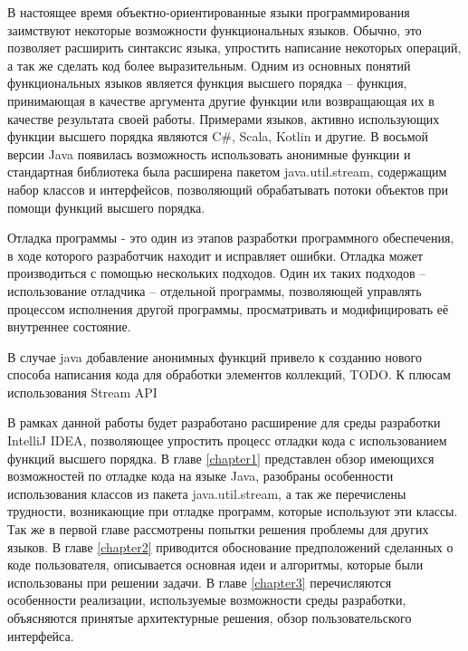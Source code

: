 В настоящее время объектно-ориентированные языки программирования заимствуют некоторые возможности функциональных языков.  Обычно, это позволяет расширить синтаксис языка, упростить написание некоторых операций, а так же сделать код более выразительным. Одним из основных понятий функциональных языков является функция высшего порядка -- функция, принимающая в качестве аргумента другие функции или возвращающая их в качестве результата своей работы. Примерами языков, активно использующих функции высшего порядка являются C\#, Scala, Kotlin и другие. В восьмой версии Java появилась возможность использовать анонимные функции и стандартная библиотека была расширена пакетом java.util.stream, содержащим набор классов и интерфейсов, позволяющий обрабатывать потоки объектов при помощи функций высшего порядка.

Отладка программы - это один из этапов разработки программного обеспечения, в ходе которого разработчик находит и исправляет ошибки. Отладка может производиться с помощью нескольких подходов. Один их таких подходов -- использование отладчика -- отдельной программы, позволяющей управлять процессом исполнения другой программы, просматривать и модифицировать её внутреннее состояние.

В случае java добавление анонимных функций привело к созданию нового способа написания кода для обработки элементов коллекций, TODO. К плюсам использования Stream API

В рамках данной работы будет разработано расширение для среды разработки IntelliJ IDEA, позволяющее упростить процесс отладки кода с использованием функций высшего порядка. В главе \ref{chapter1} представлен обзор имеющихся возможностей по отладке кода на языке Java, разобраны особенности использования классов из пакета java.util.stream, а так же перечислены трудности, возникающие при отладке программ, которые используют эти классы. Так же в первой главе рассмотрены попытки решения проблемы для других языков. В главе \ref{chapter2} приводится обоснование предположений сделанных о коде пользователя, описывается основная идеи и алгоритмы, которые были использованы при решении задачи. В главе \ref{chapter3} перечисляются особенности реализации, используемые возможности среды разработки, объясняются принятые архитектурные решения, обзор пользовательского интерфейса.

